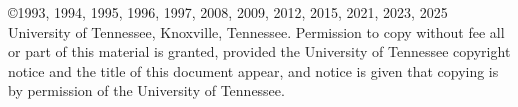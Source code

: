 \vfill%

\noindent \copyright 1993, 1994, 1995, 1996, 1997,
2008, 2009, 2012, 2015, 2021, 2023, 2025
University of Tennessee, Knoxville, Tennessee.
Permission to copy without fee all or part of this material is
granted, provided the University of Tennessee copyright notice and the
title of this document appear, and notice is given that copying is by
permission of the University of Tennessee.
